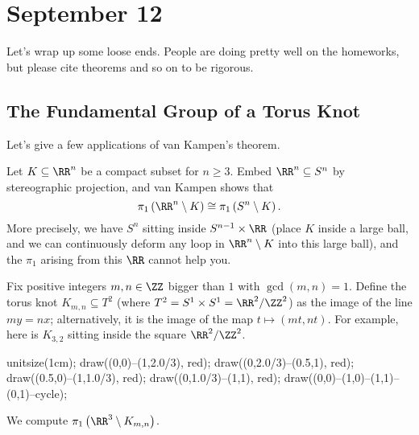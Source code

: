 \documentclass[../notes.tex]{subfiles}
\begin{document}
\section{September 12}

Let's wrap up some loose ends. People are doing pretty well on the homeworks, but please cite theorems and so on to be rigorous.

\subsection{The Fundamental Group of a Torus Knot}
Let's give a few applications of van Kampen's theorem.
\begin{example}
	Let $K\subseteq\RR^n$ be a compact subset for $n\ge3$. Embed $\RR^n\subseteq S^n$ by stereographic projection, and van Kampen shows that
	\[\pi_1\left(\RR^n\setminus K\right)\cong\pi_1\left(S^n\setminus K\right).\]
	More precisely, we have $S^n$ sitting inside $S^{n-1}\times\RR$ (place $K$ inside a large ball, and we can continuously deform any loop in $\RR^n\setminus K$ into this large ball), and the $\pi_1$ arising from this $\RR$ cannot help you.
\end{example}
\begin{example}
	Fix positive integers $m,n\in\ZZ$ bigger than $1$ with $\gcd(m,n)=1$. Define the torus knot $K_{m,n}\subseteq T^2$ (where $T^2=S^1\times S^1=\RR^2/\ZZ^2$) as the image of the line $my=nx$; alternatively, it is the image of the map $t\mapsto(mt,nt)$. For example, here is $K_{3,2}$ sitting inside the square $\RR^2/\ZZ^2$.
	\begin{center}
		\begin{asy}
			unitsize(1cm);
			draw((0,0)--(1,2.0/3), red);
			draw((0,2.0/3)--(0.5,1), red);
			draw((0.5,0)--(1,1.0/3), red);
			draw((0,1.0/3)--(1,1), red);
			draw((0,0)--(1,0)--(1,1)--(0,1)--cycle);
		\end{asy}
	\end{center}
	We compute $\pi_1\left(\RR^3\setminus K_{m,n}\right)$.
\end{example}
\end{document}
